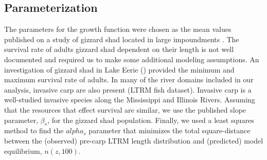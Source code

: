 \documentclass[preprint,review,12pt,authoryear]{elsarticle}
\begin{document}
\subsection{Parameterization}
The parameters for the growth function were chosen as the mean values published on a study of gizzard shad located in large impoundments \citep{michaletz2017variation}. The survival rate of adults gizzard shad dependent on their length is not well documented and required us to make some additional modeling assumptions.  An investigation of gizzard shad in Lake Eerie (\cite{bodola1955life}) provided the minimum and maximum survival rate of adults. In many of the river domains included in our analysis, invasive carp are also present (LTRM fish dataset).  Invasive carp is a well-studied invasive species along the Mississippi and Illinois Rivers.  Assuming that the resources that effect survival are similar, we use the published \citep{erickson2017integral} slope parameter, $\beta_s$, for the gizzard shad population.   Finally, we used a least squares method to find the $alpha_s$ parameter that 
minimizes the total square-distance between the (observed) pre-carp LTRM length distribution and (predicted) model equilibrium, $n(z,100)$.  
%
%
\end{document}
